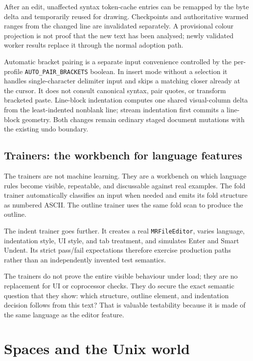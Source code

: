 \documentclass[a4paper,10pt,twoside,openany]{book}
\begin{document}
After an edit, unaffected syntax token-cache entries can be remapped by the
byte delta and temporarily reused for drawing. Checkpoints and authoritative
warmed ranges from the changed line are invalidated separately. A provisional
colour projection is not proof that the new text has been analysed; newly
validated worker results replace it through the normal adoption path.

Automatic bracket pairing is a separate input convenience controlled by the
per-profile \texttt{AUTO\_PAIR\_BRACKETS} boolean. In insert mode without a
selection it handles single-character delimiter input and skips a matching
closer already at the cursor. It does not consult canonical syntax, pair
quotes, or transform bracketed paste. Line-block indentation computes one
shared visual-column delta from the least-indented nonblank line; stream
indentation first commits a line-block geometry. Both changes remain ordinary
staged document mutations with the existing undo boundary.
\chapter{Trainers: the workbench for language features}

The trainers are not machine learning. They are a workbench on which language
rules become visible, repeatable, and discussable against real examples. The
fold trainer automatically classifies an input when needed and emits its fold
structure as numbered ASCII. The outline trainer uses the same fold scan to
produce the outline.

The indent trainer goes further. It creates a real \texttt{MRFileEditor},
varies language, indentation style, UI style, and tab treatment, and simulates
Enter and Smart Undent. Its strict pass/fail expectations therefore exercise
production paths rather than an independently invented test semantics.

The trainers do not prove the entire visible behaviour under load; they are no
replacement for UI or coprocessor checks. They do secure the exact semantic
question that they show: which structure, outline element, and indentation
decision follows from this text? That is valuable testability because it is
made of the same language as the editor feature.

\part{Spaces and the Unix world}
\end{document}
